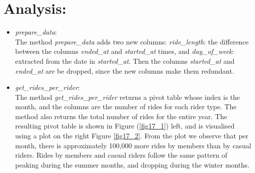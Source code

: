 \documentclass[12pt]{article}
\begin{document}
\section*{Analysis:}
\begin{itemize}
\item \textit{prepare\_data}:\\
	The method \textit{prepare\_data} adds two new columns: \textit{ride\_length}: the difference between the columns \textit{ended\_at} and \textit{started\_at} times, and \textit{day\_of\_week}: extracted from the date in \textit{started\_at}. Then the columns \textit{started\_at} and \textit{ended\_at} are be dropped, since the new columns make them redundant.
	
	\item \textit{get\_rides\_per\_rider}:\\
	The method \textit{get\_rides\_per\_rider} returns a pivot table whose index is the month, and the columns are the number of rides for each rider type. The method also returns the total number of rides for the entire year. The resulting pivot table is shown in Figure (\ref{fig17_1}) left, and is visualised using a plot on the right Figure \ref{fig17_2}. From the plot we observe that per month, there is approximately 100,000 more rides by members than by casual riders. Rides by members and casual riders follow the same pattern of peaking during the summer months, and dropping during the winter months. 


\end{itemize}
\end{document}
